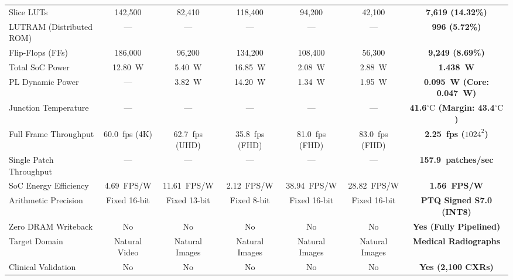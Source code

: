 \documentclass[conference]{IEEEtran}
\begin{document}
\begin{table}[!t]
\begin{tabular}{lcccccc}
Slice LUTs & 142,500 & 82,410 & 118,400 & 94,200 & 42,100 & \textbf{7,619 (14.32\%)} \\
LUTRAM (Distributed ROM) & --- & --- & --- & --- & --- & \textbf{996 (5.72\%)} \\
Flip-Flops (FFs) & 186,000 & 96,200 & 134,200 & 108,400 & 56,300 & \textbf{9,249 (8.69\%)} \\
Total SoC Power & 12.80~W & 5.40~W & 16.85~W & 2.08~W & 2.88~W & \textbf{1.438~W} \\
PL Dynamic Power & --- & 3.82~W & 14.20~W & 1.34~W & 1.95~W & \textbf{0.095~W (Core: 0.047~W)} \\
Junction Temperature & --- & --- & --- & --- & --- & \textbf{41.6$^\circ\text{C}$ (Margin: 43.4$^\circ\text{C}$)} \\
Full Frame Throughput & 60.0~fps (4K) & 62.7~fps (UHD) & 35.8~fps (FHD) & 81.0~fps (FHD) & 83.0~fps (FHD) & \textbf{2.25~fps ($1024^2$)} \\
Single Patch Throughput & --- & --- & --- & --- & --- & \textbf{157.9~patches/sec} \\
SoC Energy Efficiency & 4.69~FPS/W & 11.61~FPS/W & 2.12~FPS/W & 38.94~FPS/W & 28.82~FPS/W & \textbf{1.56~FPS/W} \\
Arithmetic Precision & Fixed 16-bit & Fixed 13-bit & Fixed 8-bit & Fixed 16-bit & Fixed 16-bit & \textbf{PTQ Signed S7.0 (INT8)} \\
Zero DRAM Writeback & No & No & No & No & No & \textbf{Yes (Fully Pipelined)} \\
Target Domain & Natural Video & Natural Images & Natural Images & Natural Images & Natural Images & \textbf{Medical Radiographs} \\
Clinical Validation & No & No & No & No & No & \textbf{Yes (2,100 CXRs)} \\
\bottomrule
\end{tabular}
\end{table}
\end{document}
